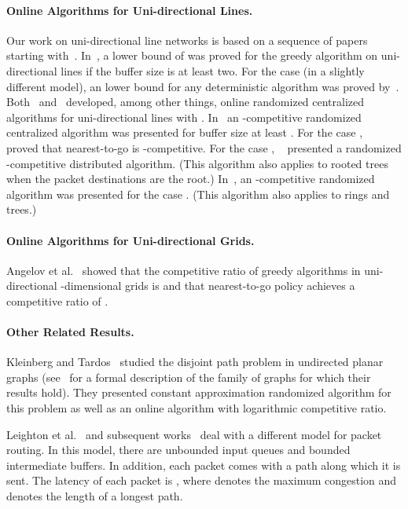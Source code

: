 \documentclass[11pt]{article}
\newenvironment{proof sketch}[1]{\noindent {\emph{Proof sketch of #1:}}}{\hfill \qed}
\begin{document}
\paragraph{Online Algorithms for Uni-directional Lines.}
Our work on uni-directional line networks is based on a
sequence of papers starting with~\cite{AKOR}.
In~\cite{AKOR}, a lower bound of  was
proved for the greedy algorithm on uni-directional lines if
the buffer size  is at least two. For the case  (in
a slightly different model), an  lower bound for
any deterministic algorithm was proved by~\cite{AZ,AKK}.
Both~\cite{AZ} and~\cite{AKK} developed, among other
things, online randomized centralized algorithms for
uni-directional lines with . In~\cite{AKK} an
-competitive randomized centralized algorithm
was presented for buffer size  at least . For the
case , ~\cite{AKK} proved that nearest-to-go is
-competitive. For the case ,
~\cite{AKK} presented a randomized
-competitive distributed algorithm.
(This algorithm also applies to rooted trees when the
packet destinations are the root.) In~\cite{AZ}, an
-competitive randomized algorithm was
presented for the case . (This algorithm also
applies to rings and trees.)


\paragraph{Online Algorithms for Uni-directional Grids.}
Angelov et al.~\cite{AKK} showed that the competitive ratio
of greedy algorithms in uni-directional -dimensional
grids is  and that nearest-to-go policy
achieves a competitive ratio of .

\paragraph{Other Related Results.}
Kleinberg and Tardos~\cite{KT} studied the disjoint path problem in undirected planar
graphs (see~\cite{KT} for a formal description of the family of graphs for which
their results hold).  They presented constant approximation randomized algorithm for
this problem as well as an online algorithm with logarithmic competitive ratio.

Leighton et al.~\cite{leighton1994packet} and subsequent
works~\cite{leighton1999fast,RT, srinivasan1997constant} deal with a different model
for packet routing. In this model, there are unbounded input queues and bounded
intermediate buffers. In addition, each packet comes with a path along which it is
sent. The latency of each packet is , where  denotes the maximum
congestion and  denotes the length of a longest path.
\end{document}
